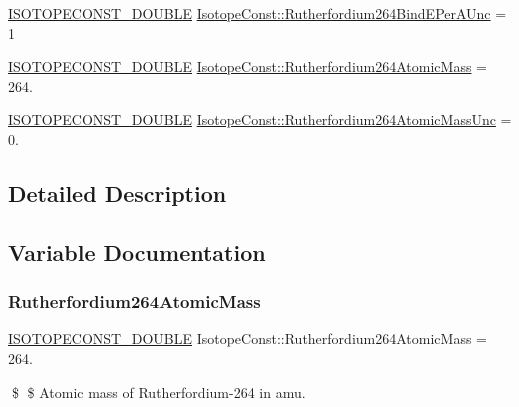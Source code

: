 \begin{DoxyCompactItemize}
\item 
\mbox{\hyperlink{group___isotope_const-_macros_ga8f45a7272ce02c0b4c65c44636ed719a}{I\+S\+O\+T\+O\+P\+E\+C\+O\+N\+S\+T\+\_\+\+D\+O\+U\+B\+LE}} \mbox{\hyperlink{group___isotope_const-_rutherfordium-_rf264_ga3f87585d69f0abb01a8eae8e1b745e25}{Isotope\+Const\+::\+Rutherfordium264\+Bind\+E\+Per\+A\+Unc}} = 1
\item 
\mbox{\hyperlink{group___isotope_const-_macros_ga8f45a7272ce02c0b4c65c44636ed719a}{I\+S\+O\+T\+O\+P\+E\+C\+O\+N\+S\+T\+\_\+\+D\+O\+U\+B\+LE}} \mbox{\hyperlink{group___isotope_const-_rutherfordium-_rf264_ga4336b057d694db950f6e6d3ffa711961}{Isotope\+Const\+::\+Rutherfordium264\+Atomic\+Mass}} = 264.
\item 
\mbox{\hyperlink{group___isotope_const-_macros_ga8f45a7272ce02c0b4c65c44636ed719a}{I\+S\+O\+T\+O\+P\+E\+C\+O\+N\+S\+T\+\_\+\+D\+O\+U\+B\+LE}} \mbox{\hyperlink{group___isotope_const-_rutherfordium-_rf264_ga8df3397112277c4b666c238feaad586d}{Isotope\+Const\+::\+Rutherfordium264\+Atomic\+Mass\+Unc}} = 0.
\end{DoxyCompactItemize}


\subsection{Detailed Description}


\subsection{Variable Documentation}
\mbox{\label{group___isotope_const-_rutherfordium-_rf264_ga4336b057d694db950f6e6d3ffa711961}} 
\subsubsection{\texorpdfstring{Rutherfordium264\+Atomic\+Mass}{Rutherfordium264AtomicMass}}
{\footnotesize\ttfamily \mbox{\hyperlink{group___isotope_const-_macros_ga8f45a7272ce02c0b4c65c44636ed719a}{I\+S\+O\+T\+O\+P\+E\+C\+O\+N\+S\+T\+\_\+\+D\+O\+U\+B\+LE}} Isotope\+Const\+::\+Rutherfordium264\+Atomic\+Mass = 264.}

\$ \$ Atomic mass of Rutherfordium-\/264 in amu. \mbox{\label{group___isotope_const-_rutherfordium-_rf264_ga8df3397112277c4b666c238feaad586d}} 
